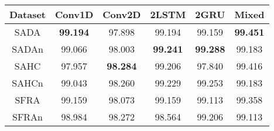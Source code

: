 \begin{tabular}{c|ccccc}\toprule
Dataset & Conv1D            & Conv2D            & 2LSTM             &  2GRU             & Mixed \\\midrule
SADA    & \textbf{99.194}   & 97.898            & 99.194            & 99.159            & \textbf{99.451} \\
SADAn   & 99.066            & 98.003            & \textbf{99.241}   & \textbf{99.288}   & 99.183 \\
SAHC    & 97.957            & \textbf{98.284}   & 99.206            & 97.840            & 99.416 \\
SAHCn   & 99.043            & 98.260            & 99.229            & 99.253            & 99.183 \\
SFRA    & 99.159            & 98.073            & 99.159            & 99.113            & 99.358 \\
SFRAn   & 98.984            & 98.272            & 98.564            & 99.206            & 99.113 \\\bottomrule
\end{tabular}